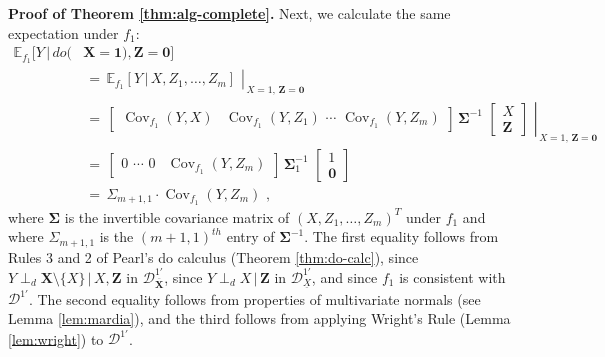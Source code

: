 \documentclass[11pt]{article}
\DeclareMathOperator{\Cov}{Cov}
\newcommand{\mb}[1]{\mathbf{#1}}
\newcommand{\dsepp}{\perp_{d}}
\newcommand{\g}[1][G]{\mathcal{#1}}
\newcommand{\E}{\mathbb{E}}
\newenvironment{proofofnoqed}[1][]{\noindent \textbf{Proof of #1.}}{}
\begin{document}
\begin{proofofnoqed}[Theorem \ref{thm:alg-complete}]
    Next, we calculate the same expectation under $f_1$:
    \begin{align*}
        \E_{f_1}[Y \,|\, do(&\mb{X}= \mb{1}), \mb{Z} = \mb{0}]\\
            &\,=\, \left. \E_{f_1}[Y \,|\, X, Z_1, \dots, Z_m] \,\, \right\rvert_{\, X=1, \, \mb{Z}=\mb{0}}\\
            &\,=\, \left. \begin{bmatrix}
                                \Cov_{f_1}(Y, X) & \Cov_{f_1}(Y,Z_1) \,\, \cdots \,\, \Cov_{f_1}(Y, Z_m) 
                          \end{bmatrix} \,
                          \mb{\Sigma}^{-1} \,\, 
                          \begin{bmatrix}
                                X \\
                                \mathbf{Z}
                          \end{bmatrix} \,\, \right\rvert_{\, X=1, \, \mb{Z}=\mb{0}}\\
            &\,=\, \begin{bmatrix}
                                0 \,\, \cdots \,\, 0 & \Cov_{f_1}(Y, Z_m) 
                          \end{bmatrix} \,
                          \mb{\Sigma}_1^{-1} \,\, 
                          \begin{bmatrix}
                                1 \\
                                \mathbf{0}
                          \end{bmatrix}\\
            &\,=\, \Sigma_{m+1,1} \cdot \Cov_{f_1}(Y, Z_m) \,\,,
    \end{align*} 
    where $\mb{\Sigma}$ is the invertible covariance matrix of $(X, Z_1, \dots, Z_m)^T$ under $f_1$ and where $\Sigma_{m+1,1}$ is the $(m+1,1)^{th}$ entry of $\mb{\Sigma}^{-1}$. The first equality follows from Rules 3 and 2 of Pearl's do calculus (Theorem \ref{thm:do-calc}), since $Y \dsepp \mb{X} \setminus \{X\} \,|\, X, \mb{Z}$ in $\g[D]^{1'}_{\overline{\mb{X}}}$, since $Y \dsepp X \,|\, \mb{Z}$ in $\g[D]^{1'}_{\underline{X}}$, and since $f_1$ is consistent with $\g[D]^{1'}$. The second equality follows from properties of multivariate normals (see Lemma \ref{lem:mardia}), and the third follows from applying Wright's Rule (Lemma \ref{lem:wright}) to $\g[D]^{1'}$.


\end{proofofnoqed}
\end{document}
